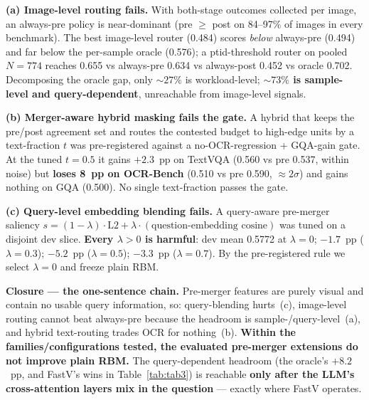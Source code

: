 \documentclass[sigconf,review,anonymous]{acmart}
\begin{document}
\textbf{(a) Image-level routing fails.} With both-stage outcomes collected per
image, an always-pre policy is near-dominant (pre $\geq$ post on 84--97\% of
images in every benchmark). The best image-level router (0.484) scores
\emph{below} always-pre (0.494) and far below the per-sample oracle (0.576); a
ptid-threshold router on pooled $N = 774$ reaches 0.655 vs always-pre 0.634 vs
always-post 0.452 vs oracle 0.702. Decomposing the oracle gap, only ${\sim}27\%$
is workload-level; \textbf{${\sim}73\%$ is sample-level and query-dependent},
unreachable from image-level signals.

\textbf{(b) Merger-aware hybrid masking fails the gate.} A hybrid that keeps the
pre/post agreement set and routes the contested budget to high-edge units by a
text-fraction $t$ was pre-registered against a no-OCR-regression + GQA-gain
gate. At the tuned $t = 0.5$ it gains $+2.3$~pp on TextVQA (0.560 vs pre 0.537,
within noise) but \textbf{loses 8~pp on OCR-Bench} (0.510 vs pre 0.590,
$\approx 2\sigma$) and gains nothing on GQA (0.500). No single text-fraction
passes the gate.

\textbf{(c) Query-level embedding blending fails.} A query-aware pre-merger
saliency $s = (1 - \lambda)\cdot\mathrm{L2} + \lambda\cdot(\text{question-embedding cosine})$
was tuned on a disjoint dev slice. \textbf{Every $\lambda > 0$ is harmful}: dev
mean 0.5772 at $\lambda = 0$; $-1.7$~pp ($\lambda = 0.3$); $-5.2$~pp
($\lambda = 0.5$); $-3.3$~pp ($\lambda = 0.7$). By the pre-registered rule we
select $\lambda = 0$ and freeze plain RBM.

\textbf{Closure --- the one-sentence chain.} Pre-merger features are purely
visual and contain no usable query information, so: query-blending hurts~(c),
image-level routing cannot beat always-pre because the headroom is
sample-/query-level~(a), and hybrid text-routing trades OCR for nothing~(b).
\textbf{Within the families/configurations tested, the evaluated pre-merger
extensions do not improve plain RBM.} The
query-dependent headroom (the oracle's $+8.2$~pp, and FastV's wins in
Table~\ref{tab:tab3}) is reachable \textbf{only after the LLM's cross-attention
layers mix in the question} --- exactly where FastV operates.
\end{document}
